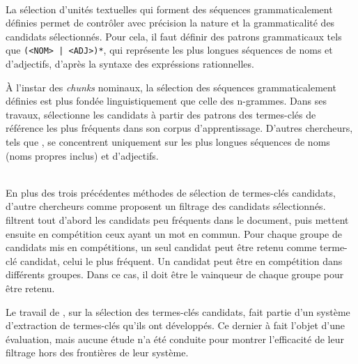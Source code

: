     \begin{example}
    \end{example}

    ~\\La sélection d'unités textuelles qui forment des séquences
    grammaticalement définies permet de contrôler
    avec précision la nature et la grammaticalité des candidats sélectionnés.
    Pour cela, il faut définir des patrons grammaticaux tels que \texttt{(<NOM>
    | <ADJ>)*}, qui représente les plus longues séquences de noms et
    d'adjectifs, d'après la syntaxe des expréssions rationnelles.

    À l'instar des \textit{chunks} nominaux, la sélection des séquences
    grammaticalement définies est plus fondée linguistiquement que celle des
    n-grammes. Dans ses travaux, 
    sélectionne les candidats à partir des patrons des termes-clés de référence
    les plus fréquents dans son corpus d'apprentissage. D'autres chercheurs,
    tels que , se concentrent uniquement sur les plus
    longues séquences de noms (noms propres inclus) et d'adjectifs.

    \begin{example}
    \end{example}

    ~\\En plus des trois précédentes méthodes de sélection de termes-clés
    candidats, d'autre chercheurs comme
     proposent un filtrage
    des candidats sélectionnés.
     filtrent tout d'abord
    les candidats peu fréquents dans le document, puis mettent ensuite en
    compétition ceux ayant un mot en commun. Pour chaque groupe de
    candidats mis en compétitions, un seul candidat peut être retenu comme
    terme-clé candidat, celui le plus fréquent. Un candidat peut être en
    compétition dans différents groupes. Dans ce cas, il doit être le
    \og{}vainqueur\fg{} de chaque groupe pour être retenu.

    Le travail de , sur la
    sélection des termes-clés candidats, fait partie d'un système d'extraction
    de termes-clés qu'ils ont développés. Ce dernier à fait l'objet d'une
    évaluation, mais aucune étude n'a été conduite pour montrer l'efficacité de
    leur filtrage hors des frontières de leur système.

